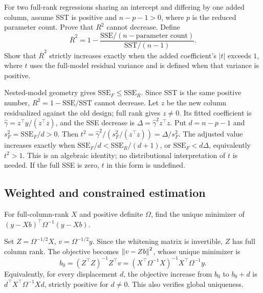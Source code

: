 \begin{problem}
For two full-rank regressions sharing an intercept and differing by one
added column, assume SST is positive and $n-p-1>0$, where $p$ is the
reduced parameter count. Prove that $R^2$ cannot decrease. Define
\[
\overline R^2=1-\frac{\mathrm{SSE}/(n-\text{parameter count})}{\mathrm{SST}/(n-1)}.
\]
Show that $\overline R^2$ strictly increases exactly when the added
coefficient's $|t|$ exceeds $1$, where $t$ uses the full-model residual
variance and is defined when that variance is positive.
\end{problem}
\begin{solution}
Nested-model geometry gives $\mathrm{SSE}_F\leqslant\mathrm{SSE}_R$.
Since SST is the same positive number, $R^2=1-\mathrm{SSE}/\mathrm{SST}$
cannot decrease. Let $z$ be the new column residualized against the old
design; full rank gives $z\ne0$. Its fitted coefficient is
$\widehat\gamma=z^\top y/(z^\top z)$, and the SSE decrease is
$\Delta=\widehat\gamma^2z^\top z$.
Put $d=n-p-1$ and $s_F^2=\mathrm{SSE}_F/d>0$.
Then $t^2=\widehat\gamma^2/(s_F^2/(z^\top z))=\Delta/s_F^2$.
The adjusted value increases exactly when
$\mathrm{SSE}_F/d<\mathrm{SSE}_R/(d+1)$, or
$\mathrm{SSE}_F<d\Delta$, equivalently $t^2>1$.
This is an algebraic identity; no distributional interpretation of $t$
is needed. If the full SSE is zero, $t$ in this form is undefined.
\end{solution}

\subsection*{Weighted and constrained estimation}
\begin{problem}\label{ex:11:gls}
For full-column-rank $X$ and positive definite $\Omega$, find the unique
minimizer of $(y-Xb)^\top\Omega^{-1}(y-Xb)$.
\end{problem}
\begin{solution}
Set $Z=\Omega^{-1/2}X$, $v=\Omega^{-1/2}y$. Since the whitening matrix
is invertible, $Z$ has full column rank. The objective becomes
$\left\lVert v-Zb\right\rVert^2$, whose unique minimizer is
\[
b_0=(Z^\top Z)^{-1}Z^\top v
=(X^\top\Omega^{-1}X)^{-1}X^\top\Omega^{-1}y.
\]
Equivalently, for every displacement $d$, the objective increase from
$b_0$ to $b_0+d$ is $d^\top X^\top\Omega^{-1}Xd$, strictly positive
for $d\ne0$. This also verifies global uniqueness.
\end{solution}

